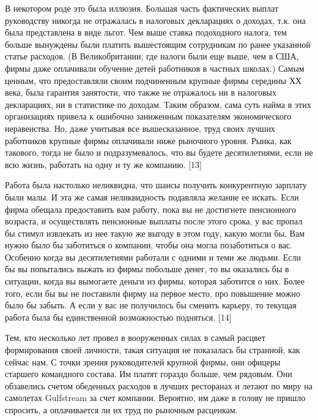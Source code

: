 \documentclass[ebook,12pt,oneside,openany]{memoir}
\begin{document}
В некотором роде это была иллюзия. Большая часть фактических выплат
руководству никогда не отражалась в налоговых декларациях о доходах,
т.к. она была представлена в виде льгот. Чем выше ставка подоходного
налога, тем больше вынуждены были платить вышестоящим сотрудникам по
ранее указанной статье расходов. (В Великобритании, где налоги были
еще выше, чем в США, фирмы даже оплачивали обучение детей работников в
частных школах.) Самым ценным, что предоставляли своим подчиненным
крупные фирмы середины ХХ века, была гарантия занятости, что также не
отражалось ни в налоговых декларациях, ни в статистике по доходам.
Таким образом, сама суть найма в этих организациях привела к ошибочно
заниженным показателям экономического неравенства. Но, даже учитывая
все вышесказанное, труд своих лучших работников крупные фирмы
оплачивали ниже рыночного уровня. Рынка, как такового, тогда не было и
подразумевалось, что вы будете десятилетиями, если не всю жизнь,
работать на одну и ту же компанию. [13] \newline

Работа была настолько неликвидна, что шансы получить конкурентную
зарплату были малы. И эта же самая неликвидность подавляла желание ее
искать. Если фирма обещала предоставить вам работу, пока вы не
достигнете пенсионного возраста, и осуществлять пенсионные выплаты
после этого срока, у вас пропал бы стимул извлекать из нее такую же
выгоду в этом году, какую могли бы. Вам нужно было бы заботиться о
компании, чтобы она могла позаботиться о вас. Особенно когда вы
десятилетиями работали с одними и теми же людьми. Если бы вы
попытались выжать из фирмы побольше денег, то вы оказались бы в
ситуации, когда вы вымогаете деньги из фирмы, которая заботится о них.
Более того, если бы вы не поставили фирму на первое место, про
повышение можно было бы забыть. А если у вас не получилось бы сменить
карьеру, то текущая работа была бы единственной возможностью
подняться. [14] \newline

Тем, кто несколько лет провел в вооруженных силах в самый расцвет
формирования своей личности, такая ситуация не показалась бы странной,
как сейчас нам. С точки зрения руководителей крупной фирмы, они
офицеры старшего командного состава. Им платят гораздо больше, чем
рядовым. Они обзавелись счетом обеденных расходов в лучших ресторанах
и летают по миру на самолетах Gulfstream за счет компании. Вероятно,
им даже в голову не пришло спросить, а оплачивается ли их труд по
рыночным расценкам. \newline
\end{document}

